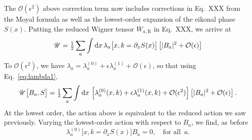 %
The $\mathcal{O}(\epsilon^{2})$ above correction term now includes corrections in Eq.~XXX from the Moyal formula as well as the lowest-order expansion of the eikonal phase $S(x)$.
Putting the reduced Wigner tensor $W_{a,\text{R}}$ in Eq.~XXX, we arrive at
%
\begin{equation}
  \mathscr{U} = \tfrac{1}{2} \sum_{a} \int \dd{x}\, \lambda_{a}\big[x, k = \partial_{x} S(x)\big]\left[\abs{B_a}^{2} + \mathcal{O}(\epsilon)\right]
\end{equation}
%
To $\mathcal{O}(\epsilon^{2})$, we have $\lambda_{a} = \lambda_{a}^{(0)} + \epsilon\lambda_{a}^{(1)} + \mathcal{O}(\epsilon)$, so that using Eq.~\eqref{eq:lambda1},
%
\begin{equation}
  \mathscr{U}\big[B_{a}, S\big] = \tfrac{1}{2} \sum_{a} \int \dd{x}\, \left[\lambda_{a}^{(0)}(x, k) + \epsilon\lambda_{a}^{(1)}(x, k) + \mathcal{O}(\epsilon^{2})\right]\left[\abs{B_{a}}^{2} + \mathcal{O}(\epsilon)\right].
\end{equation}
%
At the lowest order, the action above is equivalent to the reduced action we saw previously.
Varying the lowest-order action with respect to $B_{a}$, we find, as before
%
\begin{equation}
  \lambda_{a}^{(0)}\big[x, k=\partial_{x}S(x)\big]B_{a} = 0,
  \quad\text{for all}\enspace a.
\end{equation}
%

